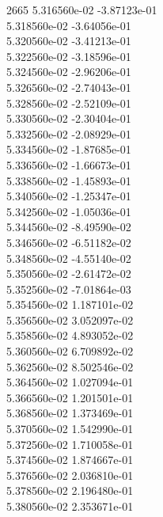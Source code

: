 2665	5.316560e-02	-3.87123e-01	\\ 	5.318560e-02	-3.64056e-01	\\ 	5.320560e-02	-3.41213e-01	\\ 	5.322560e-02	-3.18596e-01	\\ 	5.324560e-02	-2.96206e-01	\\ 	5.326560e-02	-2.74043e-01	\\ 	5.328560e-02	-2.52109e-01	\\ 	5.330560e-02	-2.30404e-01	\\ 	5.332560e-02	-2.08929e-01	\\ 	5.334560e-02	-1.87685e-01	\\ 	5.336560e-02	-1.66673e-01	\\ 	5.338560e-02	-1.45893e-01	\\ 	5.340560e-02	-1.25347e-01	\\ 	5.342560e-02	-1.05036e-01	\\ 	5.344560e-02	-8.49590e-02	\\ 	5.346560e-02	-6.51182e-02	\\ 	5.348560e-02	-4.55140e-02	\\ 	5.350560e-02	-2.61472e-02	\\ 	5.352560e-02	-7.01864e-03	\\ 	5.354560e-02	1.187101e-02	\\ 	5.356560e-02	3.052097e-02	\\ 	5.358560e-02	4.893052e-02	\\ 	5.360560e-02	6.709892e-02	\\ 	5.362560e-02	8.502546e-02	\\ 	5.364560e-02	1.027094e-01	\\ 	5.366560e-02	1.201501e-01	\\ 	5.368560e-02	1.373469e-01	\\ 	5.370560e-02	1.542990e-01	\\ 	5.372560e-02	1.710058e-01	\\ 	5.374560e-02	1.874667e-01	\\ 	5.376560e-02	2.036810e-01	\\ 	5.378560e-02	2.196480e-01	\\ 	5.380560e-02	2.353671e-01	\\ \hline
